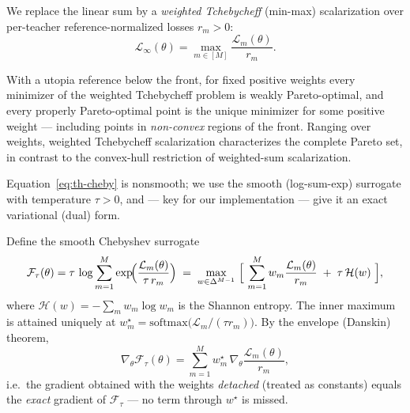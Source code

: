 We replace the linear sum by a \emph{weighted Tchebycheff} (min-max) scalarization over
per-teacher reference-normalized losses $r_m>0$:
\begin{equation}
\label{eq:th-cheby}
\mathcal L_{\infty}(\theta)=\max_{m\in[M]}\frac{\mathcal L_m(\theta)}{r_m}.
\end{equation}

\begin{theorem}
\label{thm:cheby}
With a utopia reference below the front, for fixed positive weights every minimizer of
the weighted Tchebycheff problem is weakly Pareto-optimal, and every properly
Pareto-optimal point is the unique minimizer for some positive weight --- including
points in \emph{non-convex} regions of the front. Ranging over weights, weighted
Tchebycheff scalarization characterizes the complete Pareto set, in contrast to the
convex-hull restriction of weighted-sum scalarization.
\end{theorem}

Equation~\eqref{eq:th-cheby} is nonsmooth; we use the smooth (log-sum-exp) surrogate
with temperature $\tau>0$, and --- key for our implementation --- give it an exact
variational (dual) form.

\begin{proposition}
\label{prop:envelope}
Define the smooth Chebyshev surrogate
\begin{equation}
\label{eq:th-lse}
\mathcal F_\tau(\theta)=\tau\,\log\sum_{m=1}^M \exp\!\Bigl(\frac{\mathcal L_m(\theta)}{\tau\,r_m}\Bigr)
\;=\;\max_{w\in\Delta^{M-1}}\ \Bigl[\ \sum_{m=1}^M w_m\frac{\mathcal L_m(\theta)}{r_m}\;+\;\tau\,\mathcal H(w)\ \Bigr],
\end{equation}
where $\mathcal H(w)=-\sum_m w_m\log w_m$ is the Shannon entropy. The inner maximum is
attained uniquely at $w_m^\star=\mathrm{softmax}\bigl(\mathcal L_m/(\tau r_m)\bigr)$.
By the envelope (Danskin) theorem,
\begin{equation}
\label{eq:th-env}
\nabla_\theta \mathcal F_\tau(\theta)=\sum_{m=1}^M w_m^\star\,\nabla_\theta \frac{\mathcal L_m(\theta)}{r_m},
\end{equation}
i.e.\ the gradient obtained with the weights \emph{detached} (treated as constants)
equals the \emph{exact} gradient of $\mathcal F_\tau$ --- no term through $w^\star$ is
missed.
\end{proposition}

